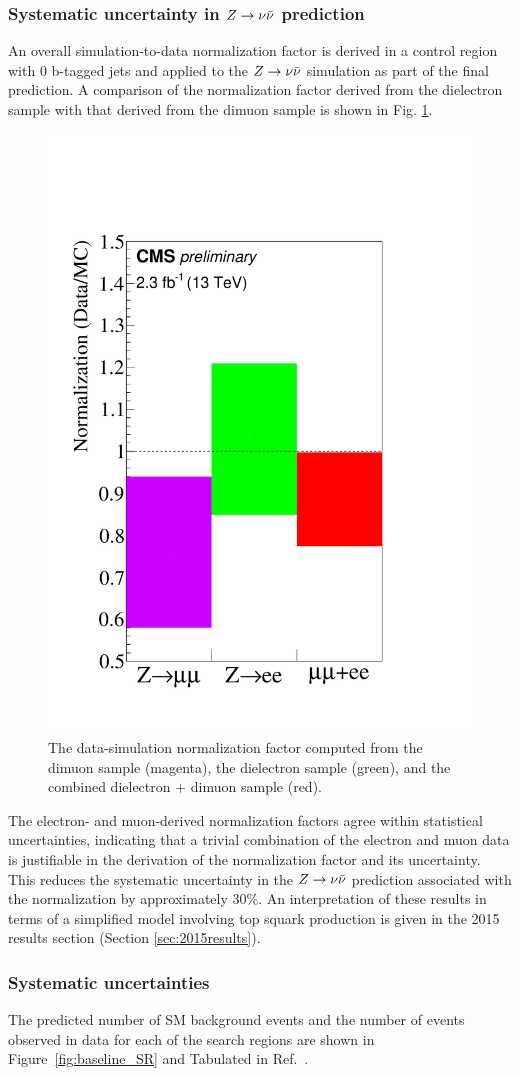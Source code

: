 \subsubsection{Systematic uncertainty in $Z\rightarrow \nu\bar{\nu}$ prediction}
An overall simulation-to-data normalization factor is derived in a control region with 0 b-tagged jets and applied to the $Z\rightarrow \nu\bar{\nu}$ simulation as part of the final prediction. A comparison of the normalization factor derived from the dielectron sample with that derived from the dimuon sample is shown in Fig. \ref{fig:ZInvNorm}.
\begin{figure}[tb!]
\centering
\includegraphics[width=0.4\linewidth]{figures/SusySearches/HadStop2015/NormFactors.pdf}
\caption{The data-simulation normalization factor computed from the dimuon sample (magenta), the dielectron sample (green), and the combined dielectron $+$ dimuon sample (red). }
\label{fig:ZInvNorm}
\end{figure}
\noindent
The electron- and muon-derived normalization factors agree within statistical uncertainties, indicating that a trivial combination of the electron and muon data is justifiable in the derivation of the normalization factor and its uncertainty. This reduces the systematic uncertainty in the $Z\rightarrow \nu\bar{\nu}$ prediction associated with the normalization by approximately 30\%. An interpretation of these results in terms of a simplified model involving top squark production is given in the 2015 results section (Section \ref{sec:2015results}).

\subsubsection{Systematic uncertainties}

The predicted number of SM background events and the number of events observed in data for each of the search regions are shown in Figure~\ref{fig:baseline_SR} and Tabulated in Ref.~\cite{CMS:2016nhb}. 

